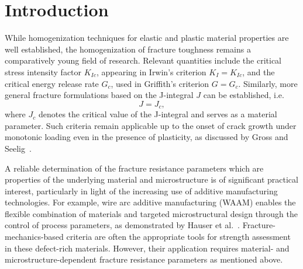 \documentclass[pdflatex,sn-mathphys-num]{sn-jnl}%
\theoremstyle{thmstyleone}%
\theoremstyle{thmstyletwo}%
\theoremstyle{thmstylethree}%
\begin{document}
\section{Introduction}\label{sec:intro}

While homogenization techniques for elastic and plastic material properties are well established,
the homogenization of fracture toughness remains a comparatively young field of research.
Relevant quantities include the critical stress intensity factor \( K_{Ic} \),
appearing in Irwin’s criterion \( K_I = K_{Ic} \), and the critical energy release rate \( G_c \),
used in Griffith’s criterion \( G = G_c \).
Similarly,  more general fracture formulations based on the J-integral $J$ can be established, i.e.
\begin{equation}
    J = J_c,
    \label{eq:fracture_criterion_J}
\end{equation}
where \( J_c \) denotes the critical value of the J-integral and serves as a material parameter.
Such criteria
remain applicable up to the onset of crack growth under monotonic loading even
in the presence of plasticity, as discussed by Gross and Seelig~\cite{gross_fracture_2011}.



A reliable determination of the fracture resistance parameters which are properties of the 
underlying material and microstructure is of significant
practical interest, particularly in light of the increasing use of
additive manufacturing technologies. For example, wire arc additive manufacturing (WAAM) enables the flexible combination of materials
and targeted microstructural design through the control of process parameters,
as demonstrated by Hauser et al.~\cite{hauser_porosity_2021}. Fracture-mechanics-based criteria are often the appropriate tools
for strength assessment in these defect-rich materials.
However, their application requires material- and microstructure-dependent
fracture resistance parameters as mentioned above.
\end{document}
